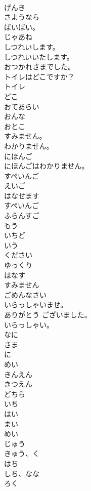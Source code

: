 \documentclass[8pt]{extreport}
\begin{document}
\begin{CJK}{UTF8}{min}
\\	げんき
\\	さようなら
\\	ばいばい。
\\	じゃあね
\\	しつれいします。
\\	しつれいいたします。
\\	おつかれさまでした。
\\	トイレはどこですか？
\\	トイレ
\\	どこ
\\	おてあらい
\\	おんな
\\	おとこ
\\	すみません。
\\	わかりません。
\\	にほんご
\\	にほんごはわかりません。
\\	すぺいんご
\\	えいご
\\	はなせます
\\	すぺいんご
\\	ふらんすご
\\	もう
\\	いちど
\\	いう
\\	ください
\\	ゆっくり
\\	はなす
\\	すみません
\\	ごめんなさい
\\	いらっしゃいませ。
\\	ありがとう ございました。
\\	いらっしゃい。
\\	なに
\\	さま
\\	に
\\	めい
\\	きんえん
\\	きつえん
\\	どちら
\\	いち
\\	はい
\\	まい
\\	めい
\\	じゅう
\\	きゅう、く
\\	はち
\\	しち、なな
\\	ろく

\end{CJK}
\end{document}
